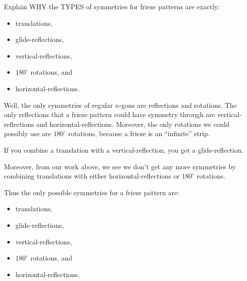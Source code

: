 \documentclass[noauthor,nooutcomes,12pt,hints,handout]{ximera}
\begin{document}
\begin{question}
  Explain WHY the TYPES of symmetries for frieze patterns are
  exactly:
  \begin{itemize}
  \item translations,
  \item glide-reflections,
  \item vertical-reflections,
  \item $180^\circ$ rotations, and
  \item horizontal-reflections.
  \end{itemize}
  \begin{freeResponse}
    Well, the only symmetries of regular $n$-gons are reflections and
    rotations. The only reflections that a frieze pattern could have
    symmetry through are vertical-reflections and
    horizontal-reflections. Moreover, the only rotations we could
    possibly use are $180^\circ$ rotations, because a frieze is an
    ``infinite'' strip.

    If you combine a translation with a vertical-reflection, you get a
    glide-reflection.

    Moreover, from our work above, we see we don't get any more
    symmetries by combining translations with either
    horizontal-reflections or $180^\circ$ rotations.

    Thus the only possible symmetries for a frieze pattern are:
    \begin{itemize}
    \item translations,
    \item glide-reflections,
    \item vertical-reflections,
    \item $180^\circ$ rotations, and
    \item horizontal-reflections.
    \end{itemize}
  \end{freeResponse}
\end{question}
\end{document}
